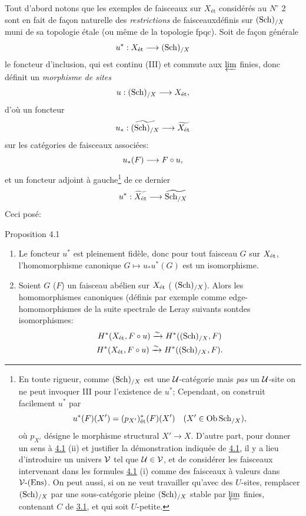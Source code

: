 \documentclass[10pt]{../fichiers-configuration-latex/smfart}
\begin{document}
Tout d'abord notons que les exemples de faisceaux sur
$X_{\text{ét}}$ considérés au $N^{\circ}$ 2 sont en fait de façon
naturelle des \emph{restrictions} de faisceaux\pageoriginale définis
sur $(\operatorname{Sch})_{/X}$ muni de sa topologie étale (ou même de la
topologie fpqc). Soit de façon générale
$$
u^{\ast} : X_{\text{ét}} \to (\Sch)_{/X}
$$
le foncteur d'inclusion, qui est continu (III) et commute aux
$\varprojlim$ finies, donc définit un \emph{morphisme de sites}
$$
u : (\Sch)_{/X} \to X_{\text{ét}}{\quoi},
$$
d'où un foncteur
$$
u_{\ast} : \widetilde{(\Sch)_{/X}} \to \widetilde{X_{\text{ét}}}
$$
sur les catégories de faisceaux associées:
$$
u_{\ast} (F) \to F \circ u{\quoi},
$$
et un foncteur adjoint à gauche\footnote{En toute rigueur, comme
$(\operatorname{Sch})_{/X}$ est une ${\mathcal U}$-catégorie mais \emph{pas} un
${\mathcal U}$-site on ne peut invoquer III pour l'existence de
$u^{\ast}$; Cependant, on construit facilement $u^{\ast}$ par
$$
u^{\ast} (F) (X') = (p_{X'})^{\ast}_{\text{ét}} (F) (X')\quad (X'\in \operatorname{Ob} \operatorname{Sch}_{/X}){},
$$
où $p_{X'}$ désigne le morphisme structural $X'\to X$. D'autre
part, pour donner un sens à \hyperref[VII.prop4.1]{4.1} (ii) et justifier la
démonstration indiquée de \hyperref[VII.prop4.1]{4.1}, il y a lieu
d'introduire un univers ${\mathcal V}$ tel que ${\mathcal U} \in {\mathcal V}$, et de
considérer les faisceaux intervenant dans les formules
\hyperref[VII.prop4.1]{4.1} (i) comme des faisceaux à valeurs dans
${\mathcal V}\text{-}(\operatorname{Ens})$. On peut aussi, si on ne veut travailler qu'avec
des $U$-sites, remplacer $(\operatorname{Sch})_{/X}$ par une sous-catégorie pleine
$(\operatorname{Sch})_{/X}$ stable par $\varprojlim$ finies, contenant $C$ de
\hyperref[VII.prop3.1]{3.1}, et qui soit $U$-petite.} de ce dernier
$$
u^{\ast} : \widetilde{X_{\text{ét}}} \to \widetilde{\Sch_{/X}}
$$
Ceci posé:

\begin{enonce*}{Proposition 4.1}
\begin{enumerate}
\renewcommand{\theenumi}{\roman{enumi}}
\renewcommand{\labelenumi}{(\theenumi)}
\item Le foncteur $u^{\ast}$ est pleinement fidèle, donc pour tout
faisceau $G$ sur $X_{\text{\rm ét}}$, l'homomorphisme canonique $G
\mapsto u_{\ast} u^{\ast} (G)$ est un isomorphisme.

\item Soient $G$ (\resp $F$) un faisceau abélien sur $X_{\text{\rm ét}}$ (\resp
$(\operatorname{Sch})_{/X}$). Alors les homomorphismes canoniques (définis par
exemple comme edge-homomorphismes de la suite spectrale de Leray
suivants sont\pageoriginale des isomorphismes:
\begin{gather*}
H^{\ast} (X_{\text{\rm ét}}, F \circ u) \xrightarrow{\sim} H^{\ast}((\operatorname{Sch})_{/X}, F)\\
H^{\ast} (X_{\text{\rm ét}}, F \circ u) \xrightarrow{\sim} H^{\ast}((\operatorname{Sch})_{/X}, F){}.
\end{gather*}
\end{enumerate}

\end{enonce*}
\end{document}
